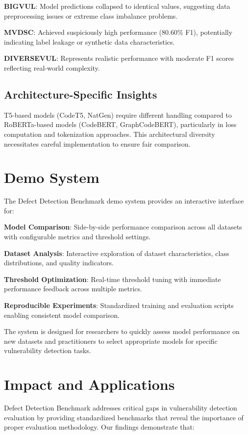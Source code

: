 \documentclass[letterpaper]{article}
\begin{document}
\textbf{BIGVUL}: Model predictions collapsed to identical values, suggesting data preprocessing issues or extreme class imbalance problems.

\textbf{MVDSC}: Achieved suspiciously high performance (80.60\% F1), potentially indicating label leakage or synthetic data characteristics.

\textbf{DIVERSEVUL}: Represents realistic performance with moderate F1 scores reflecting real-world complexity.

\subsection{Architecture-Specific Insights}
T5-based models (CodeT5, NatGen) require different handling compared to RoBERTa-based models (CodeBERT, GraphCodeBERT), particularly in loss computation and tokenization approaches. This architectural diversity necessitates careful implementation to ensure fair comparison.

\section{Demo System}

The Defect Detection Benchmark demo system provides an interactive interface for:

\textbf{Model Comparison}: Side-by-side performance comparison across all datasets with configurable metrics and threshold settings.

\textbf{Dataset Analysis}: Interactive exploration of dataset characteristics, class distributions, and quality indicators.

\textbf{Threshold Optimization}: Real-time threshold tuning with immediate performance feedback across multiple metrics.

\textbf{Reproducible Experiments}: Standardized training and evaluation scripts enabling consistent model comparison.

The system is designed for researchers to quickly assess model performance on new datasets and practitioners to select appropriate models for specific vulnerability detection tasks.

\section{Impact and Applications}

Defect Detection Benchmark addresses critical gaps in vulnerability detection evaluation by providing standardized benchmarks that reveal the importance of proper evaluation methodology. Our findings demonstrate that:
\end{document}
